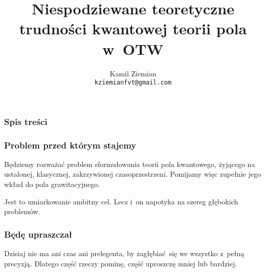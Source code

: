 \documentclass[10pt,t]{beamer}
\title{Niespodziewane teoretyczne trudności kwantowej teorii pola w~OTW}
\author{Kamil Ziemian \\
  \texttt{kziemianfvt@gmail.com} }
\begin{document}






\RaggedRight





\maketitle %





\begin{frame}
  \frametitle{Spis treści}


  \tableofcontents %

\end{frame}




\begin{frame}
  \frametitle{Problem przed którym stajemy}


  Będziemy rozważać problem sformułowania teorii pola kwantowego,
  żyjącego na ustalonej, klasycznej, zakrzywionej czasoprzestrzeni.
  Pomijamy więc zupełnie jego wkład do pola grawitacyjnego.

  Jest to umiarkowanie ambitny cel. Lecz i~on napotyka na szereg
  głębokich problemów.

\end{frame}





\begin{frame}
  \frametitle{Będę upraszczał}


  Dzisiaj nie ma ani czas ani prelegenta, by zagłębiać~się we wszystko
  z~pełną precyzją. Dlatego część rzeczy pominę, część uproszczę mniej
  lub bardziej.

\end{frame}
\end{document}
